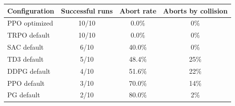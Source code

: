 \begin{tabular}{lccc}
\toprule
Configuration & Successful runs & Abort rate & Aborts by collision \\
\midrule
PPO optimized & 10/10 & 0.0\% & 0\% \\
TRPO default & 10/10 & 0.0\% & 0\% \\
SAC default & 6/10 & 40.0\% & 0\% \\
TD3 default & 5/10 & 48.4\% & 25\% \\
DDPG default & 4/10 & 51.6\% & 22\% \\
PPO default & 3/10 & 70.0\% & 14\% \\
PG default & 2/10 & 80.0\% & 2\% \\
\bottomrule
\end{tabular}
